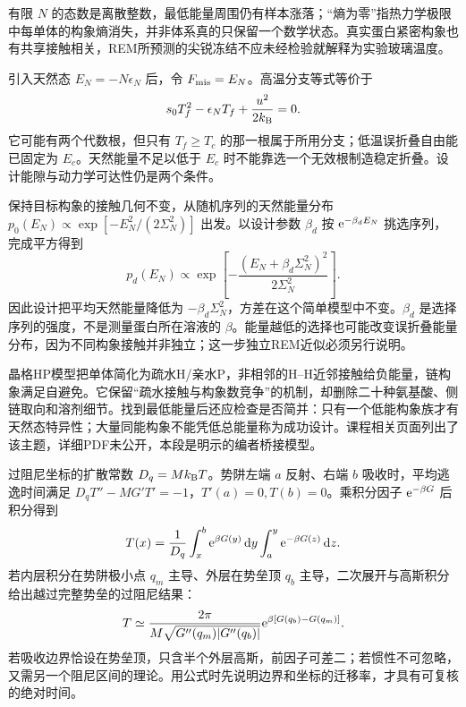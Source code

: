 有限 $N$ 的态数是离散整数，最低能量周围仍有样本涨落；“熵为零”指热力学极限中每单体的构象熵消失，并非体系真的只保留一个数学状态。真实蛋白紧密构象也有共享接触相关，REM所预测的尖锐冻结不应未经检验就解释为实验玻璃温度。

引入天然态 $E_N=-N\epsilon_N$ 后，令 $F_{\rm mis}=E_N$。高温分支等式等价于
\[
s_0T_f^2-\epsilon_NT_f+\frac{u^2}{2k_{\mathrm B}}=0.
\]
它可能有两个代数根，但只有 $T_f\ge T_c$ 的那一根属于所用分支；低温误折叠自由能已固定为 $E_c$。天然能量不足以低于 $E_c$ 时不能靠选一个无效根制造稳定折叠。设计能隙与动力学可达性仍是两个条件。

保持目标构象的接触几何不变，从随机序列的天然能量分布 $p_0(E_N)\propto\exp[-E_N^2/(2\Sigma_N^2)]$ 出发。以设计参数 $\beta_d$ 按 $\mathrm e^{-\beta_dE_N}$ 挑选序列，完成平方得到
\[
p_d(E_N)\propto\exp\!\left[-\frac{(E_N+\beta_d\Sigma_N^2)^2}{2\Sigma_N^2}\right].
\]
因此设计把平均天然能量降低为 $-\beta_d\Sigma_N^2$，方差在这个简单模型中不变。$\beta_d$ 是选择序列的强度，不是测量蛋白所在溶液的 $\beta$。能量越低的选择也可能改变误折叠能量分布，因为不同构象接触并非独立；这一步独立REM近似必须另行说明。

晶格HP模型把单体简化为疏水H/亲水P，非相邻的H--H近邻接触给负能量，链构象满足自避免。它保留“疏水接触与构象数竞争”的机制，却删除二十种氨基酸、侧链取向和溶剂细节。找到最低能量后还应检查是否简并：只有一个低能构象族才有天然态特异性；大量同能构象不能凭低总能量称为成功设计。课程相关页面列出了该主题，详细PDF未公开，本段是明示的编者桥接模型。

过阻尼坐标的扩散常数 $D_q=Mk_{\mathrm B} T$。势阱左端 $a$ 反射、右端 $b$ 吸收时，平均逃逸时间满足 $D_qT''-MG'T'=-1$，$T'(a)=0,T(b)=0$。乘积分因子 $\mathrm e^{-\beta G}$ 后积分得到
\[
T(x)=\frac1{D_q}\int_x^b\mathrm e^{\beta G(y)}\,\mathrm d y\int_a^y\mathrm e^{-\beta G(z)}\,\mathrm d z.
\]
若内层积分在势阱极小点 $q_m$ 主导、外层在势垒顶 $q_b$ 主导，二次展开与高斯积分给出越过完整势垒的过阻尼结果：
\[
T\simeq\frac{2\pi}{M\sqrt{G''(q_m)|G''(q_b)|}}\mathrm e^{\beta[G(q_b)-G(q_m)]}.
\]
若吸收边界恰设在势垒顶，只含半个外层高斯，前因子可差二；若惯性不可忽略，又需另一个阻尼区间的理论。用公式时先说明边界和坐标的迁移率，才具有可复核的绝对时间。
